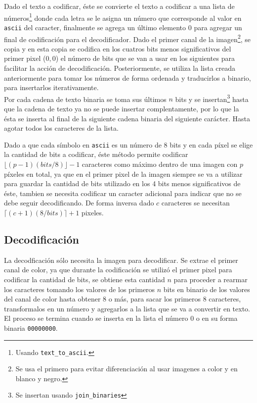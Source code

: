 \documentclass[conference]{IEEEtran}
\begin{document}
		Dado el texto a codificar, éste se convierte el texto a codificar a una lista de números\footnote{Usando \texttt{text\_to\_ascii}.} donde cada letra se le asigna un número que corresponde al valor en \texttt{ascii} del caracter, finalmente se agrega un último elemento $0$ para agregar un final de codificación para el decodificador.        
        Dado el primer canal de la imagen\footnote{Se usa el primero para evitar diferenciación al usar imagenes a color y en blanco y negro.}, se copia y en esta copia se codifica en los cuatros bits menos significativos del primer pixel ($0,0$) el número de bits que se van a usar en los siguientes para facilitar la acción de decodificación. Posteriormente, se utiliza la lista creada anteriormente para tomar los números de forma ordenada y traducirlos a binario, para insertarlos iterativamente. \\ 
        Por cada cadena de texto binaria se toma sus últimos $n$ bits y se insertan\footnote{Se insertan usando \texttt{join\_binaries}} hasta que la cadena de texto ya no se puede insertar complentamente, por lo que la ésta se inserta al final de la siguiente cadena binaria del siguiente carácter. Hasta agotar todos los caracteres de la lista.
    
        Dado a que cada símbolo en \texttt{ascii} es un número de 8 bits y en cada píxel se elige la cantidad de bits a codificar, éste método permite codificar $\lfloor (p-1)(bits / 8)\rfloor - 1$ caracteres como máximo dentro de una imagen con $p$ píxeles en total, ya que en el primer pixel de la imagen siempre se va a utilizar para guardar la cantidad de bits utilizado en los 4 bits menos significativos de éste, tambien se necesita codificar un caracter adicional para indicar que no se debe seguir decodificando. De forma inversa dado $c$ caracteres se necesitan $\lceil (c+1)(8 / bits)\rceil +1 $ pixeles.

	\subsection*{Decodificación}
		La decodficación sólo necesita la imagen para decodificar. Se extrae el primer canal de color, ya que durante la codificación se utilizó el primer pixel para codificar la cantidad de bits, se obtiene esta cantidad $n$ para proceder a rearmar los caracteres tomando los valores de los primeros $n$ bits en binario de los valores del canal de color hasta obtener 8 o más, para sacar los primeros 8 caracteres, transformalos en un número y agregarlos a la lista que se va a convertir en texto. El proceso se termina cuando se inserta en la lista el número $0$ o en su forma binaria \texttt{00000000}. 
		
\end{document}
